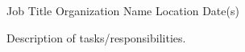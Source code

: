 

\begin{cventries}

  \cventry
    {Job Title} %
    {Organization Name} %
    {Location} %
    {Date(s)} %
    {
      \begin{cvitems} %
        \item {Description of tasks/responsibilities.}
      \end{cvitems}
    }

\end{cventries}
